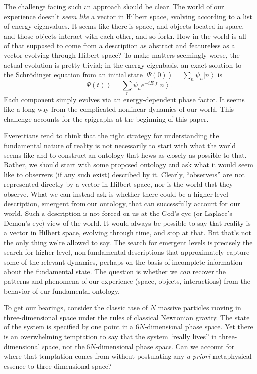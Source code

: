 \documentclass[12pt,english]{article}
\newcommand{\be}{\begin{equation}}
\newcommand{\ee}{\end{equation}}
\newcommand{\ket}[1]{\left| #1 \right\rangle}
\begin{document}
The challenge facing such an approach should be clear.
The world of our experience doesn't \emph{seem like} a vector in Hilbert space, evolving according to a list of energy eigenvalues.
It seems like there is space, and objects located in space, and those objects interact with each other, and so forth.
How in the world is all of that supposed to come from a description as abstract and featureless as a vector evolving through Hilbert space?
To make matters seemingly worse, the actual evolution is pretty trivial; in the energy eigenbasis, an exact solution to the Schr\"odinger equation from an initial state $\ket{\Psi(0)} = \sum_n \psi_n\ket{n}$ is
\be
  \ket{\Psi(t)} = \sum_n \psi_n e^{-i E_n t}\ket{n}.
\ee
Each component simply evolves via an energy-dependent phase factor.
It seems like a long way from the complicated nonlinear dynamics of our world.
This challenge accounts for the epigraphs at the beginning of this paper.

Everettians tend to think that the right strategy for understanding the fundamental nature of reality is not necessarily to start with what the world seems like and to construct an ontology that hews as closely as possible to that.
Rather, we should start with some proposed ontology and ask what it would seem like to observers (if any such exist) described by it.
Clearly, ``observers'' are not represented directly by a vector in Hilbert space, nor is the world that they observe.
What we can instead ask is whether there could be a higher-level description, emergent from our ontology, that can successfully account for our world.
Such a description is not forced on us at the God's-eye (or Laplace's-Demon's eye) view of the world.
It would always be possible to say that reality is a vector in Hilbert space, evolving through time, and stop at that.
But that's not the only thing we're allowed to say.
The search for emergent levels is precisely the search for higher-level, non-fundamental descriptions that approximately capture some of the relevant dynamics, perhaps on the basis of incomplete information about the fundamental state.
The question is whether we \emph{can} recover the patterns and phenomena of our experience (space, objects, interactions) from the behavior of our fundamental ontology.

To get our bearings, consider the classic case of $N$ massive particles moving in three-dimensional space under the rules of classical Newtonian gravity.
The state of the system is specified by one point in a $6N$-dimensional phase space.
Yet there is an overwhelming temptation to say that the system ``really lives'' in three-dimensional space, not the $6N$-dimensional phase space.
Can we account for where that temptation comes from without postulating any \emph{a priori} metaphysical essence to three-dimensional space?
\end{document}
